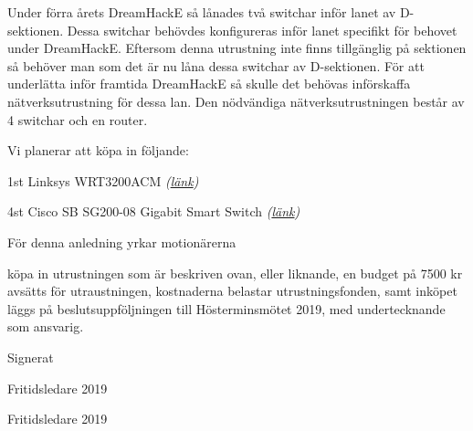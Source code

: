 \documentclass[../_main/handlingar.tex]{subfiles}
\begin{document}


Under förra årets DreamHackE så lånades två switchar inför lanet av D-sektionen. Dessa switchar behövdes konfigureras inför lanet specifikt för behovet under DreamHackE. Eftersom denna utrustning inte finns tillgänglig på sektionen så behöver man som det är nu låna dessa switchar av D-sektionen. För att underlätta inför framtida DreamHackE så skulle det behövas införskaffa nätverksutrustning för dessa lan. Den nödvändiga nätverksutrustningen består av 4 switchar och en router. 

Vi planerar att köpa in följande: 

1st Linksys WRT3200ACM \textit{(\href{https://www.netonnet.se/art/dator/natverk/router/linksys-wrt3200acm/238881.8935/}{länk})}

4st Cisco SB SG200-08 Gigabit Smart Switch \textit{(\href{https://www.komplett.se/product/638869/datorutrustning/natverk/switchar/cisco-sb-sg200-08-gigabit-smart-switch}{länk})}


För denna anledning yrkar motionärerna
    \begin{attsatser}
       \att köpa in utrustningen som är beskriven ovan, eller liknande,
       \att en budget på 7500 kr avsätts för utraustningen,
       \att kostnaderna belastar utrustningsfonden, samt
       \att inköpet läggs på beslutsuppföljningen till Hösterminsmötet 2019, med undertecknande som ansvarig.
    \end{attsatser}
    


\begin{signatures}{2}
        Signerat
        \signature{Vincent Palmer}{Fritidsledare 2019}
        \signature{Marcus Oknelid}{Fritidsledare 2019}
    \end{signatures}
\end{document}
